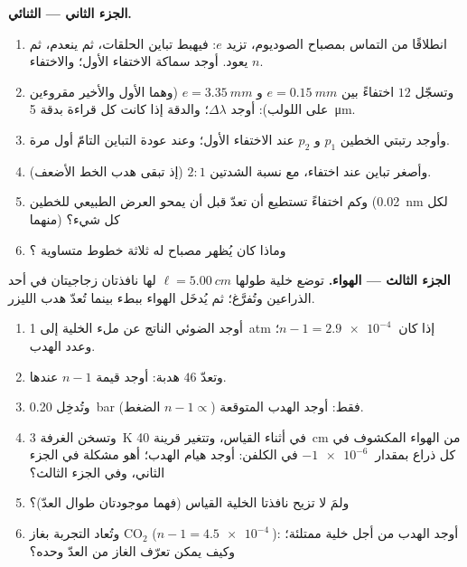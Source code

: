 \begin{problem}
\medskip
\noindent\textbf{الجزء الثاني --- الثنائي.}
\begin{enumerate}[resume]
  \item انطلاقًا من التماس بمصباح الصوديوم، تزيد $e$:
        فيهبط تباين الحلقات، ثم ينعدم، ثم يعود. أوجد سماكة
        الاختفاء الأول؛ والاختفاء $n$.
  \item وتسجّل $12$ اختفاءً بين $e = \qty{0.15}{mm}$ و
        $e = \qty{3.35}{mm}$ (وهما الأول والأخير مقروءين على اللولب):
        أوجد $\Delta\lambda$؛ والدقة إذا كانت كل قراءة بدقة \qty{5}{\micro m}.
  \item وأوجد رتبتي الخطين $p_1$ و $p_2$ عند الاختفاء
        الأول؛ وعند عودة التباين التامّ أول مرة.
  \item وأصغر تباين عند اختفاء، مع نسبة الشدتين
        $2 : 1$ (إذ تبقى هدب الخط الأضعف).
  \item وكم اختفاءً تستطيع أن تعدّ قبل أن يمحو العرض الطبيعي
        للخطين (\qty{0.02}{nm} لكل منهما) كل شيء؟
  \item وماذا كان يُظهر مصباح له ثلاثة خطوط متساوية ؟
\end{enumerate}

\medskip
\noindent\textbf{الجزء الثالث --- الهواء.}
توضع خلية طولها $\ell = \qty{5.00}{cm}$ لها نافذتان زجاجيتان في أحد
الذراعين وتُفرَّغ؛ ثم يُدخَل الهواء ببطء بينما تُعدّ هدب
الليزر.
\begin{enumerate}[resume]
  \item أوجد  الضوئي الناتج عن ملء الخلية إلى
        \qty{1}{atm} إذا كان $n - 1 = \qty{2.9e-4}{}$؛ وعدد الهدب.
  \item وتعدّ $46$ هدبة: أوجد قيمة $n - 1$ عندها.
  \item وتُدخِل \qty{0.20}{bar} فقط: أوجد الهدب المتوقعة ($n - 1 \propto$
        الضغط).
  \item وتسخن الغرفة \qty{3}{K} في أثناء القياس، وتتغير قرينة
        \qty{40}{cm} من الهواء المكشوف في كل ذراع بمقدار
        $-\qty{1e-6}{}$ في الكلفن: أوجد هيام الهدب؛ أهو مشكلة في
        الجزء الثاني، وفي الجزء الثالث؟
  \item ولمَ لا تزيح نافذتا الخلية القياس (فهما موجودتان
        طوال العدّ)؟
  \item وتُعاد التجربة بغاز CO$_2$ ($n - 1 = \qty{4.5e-4}{}$):
        أوجد الهدب من أجل خلية ممتلئة؛ وكيف يمكن تعرّف الغاز من
        العدّ وحده؟
\end{enumerate}


\end{problem}
